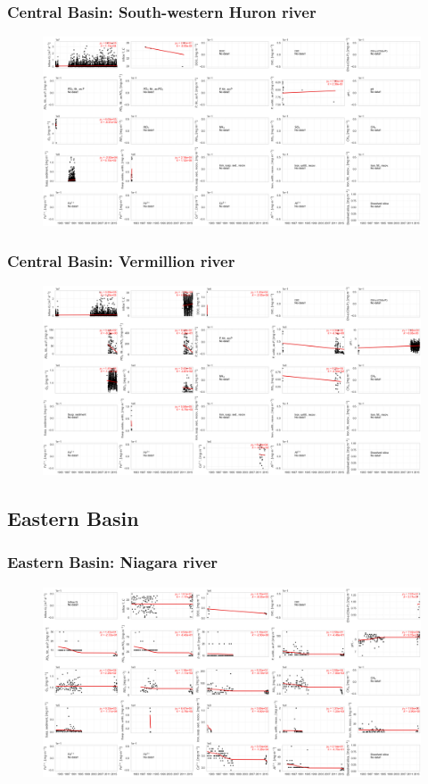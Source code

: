 \documentclass{beamer}
\begin{document}
\begin{frame}
\frametitle{Central Basin: South-western Huron river}
\begin{figure}
\includegraphics[width=\textwidth]{rivers/Central basin/plot_all southwesternhuronriver.png}
\end{figure}
\end{frame}

\begin{frame}
\frametitle{Central Basin: Vermillion river}
\begin{figure}
\includegraphics[width=\textwidth]{rivers/Central basin/plot_all vermillion.png}
\end{figure}
\end{frame}


\subsection{Eastern Basin}
\label{sub:eastern_basin}


\begin{frame}
\frametitle{Eastern Basin: Niagara river}
\begin{figure}
\includegraphics[width=\textwidth]{rivers/Eastern basin/plot_all niagarariver.png}
\end{figure}
\end{frame}
\end{document}
